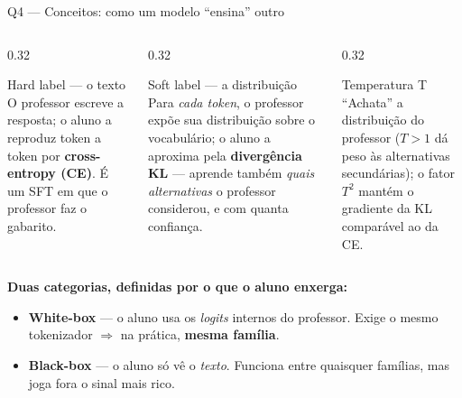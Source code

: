 \documentclass[10pt,aspectratio=169]{beamer}
\begin{document}
\begin{frame}{Q4 — Conceitos: como um modelo ``ensina'' outro}
  \begin{columns}[T]
    \begin{column}{0.32\textwidth}
      \begin{block}{Hard label — o texto}
        \small O professor escreve a resposta; o aluno a reproduz token a token por
        \textbf{cross-entropy (CE)}. É um SFT em que o professor faz o gabarito.
      \end{block}
    \end{column}
    \begin{column}{0.32\textwidth}
      \begin{block}{Soft label — a distribuição}
        \small Para \emph{cada token}, o professor expõe sua distribuição sobre o vocabulário;
        o aluno a aproxima pela \textbf{divergência KL} — aprende também \emph{quais alternativas}
        o professor considerou, e com quanta confiança.
      \end{block}
    \end{column}
    \begin{column}{0.32\textwidth}
      \begin{block}{Temperatura T}
        \small ``Achata'' a distribuição do professor ($T{>}1$ dá peso às alternativas secundárias);
        o fator $T^2$ mantém o gradiente da KL comparável ao da CE.
      \end{block}
    \end{column}
  \end{columns}
  \vspace{8pt}
  \textbf{Duas categorias, definidas por o que o aluno enxerga:}
  \begin{itemize}\small
    \item \textbf{White-box} — o aluno usa os \emph{logits} internos do professor. Exige o mesmo
      tokenizador $\Rightarrow$ na prática, \textbf{mesma família}.
    \item \textbf{Black-box} — o aluno só vê o \emph{texto}. Funciona entre quaisquer famílias,
      mas joga fora o sinal mais rico.
  \end{itemize}
\end{frame}
\end{document}
